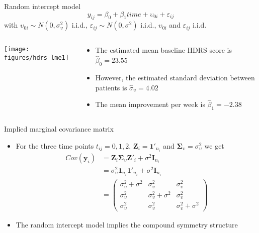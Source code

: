\documentclass{beamer}
\newcommand{\vect}[1]{\mathbf{#1}}
\newcommand{\mat}[1]{\mathbf{#1}}
\newcommand{\gmat}[1]{\boldsymbol{#1}}
\begin{document}
\begin{frame}[fragile]{Random intercept model}
  \[
    y_{ij} = \beta_0 + \beta_1 time + \upsilon_{0i} + \varepsilon_{ij}
  \]
with $\upsilon_{0i} \sim N(0, \sigma^2_{\upsilon})$ i.i.d.,
$\varepsilon_{ij} \sim N(0, \sigma^2)$ i.i.d., $\upsilon_{0i}$ and
$\varepsilon_{ij}$ i.i.d.\\[2ex]
\begin{columns}
\begin{column}{6cm}
\texttt{[image: figures/hdrs-lme1]}
\end{column}
%
\begin{column}{5cm}
  \begin{itemize}
    \item The estimated mean baseline HDRS score is $\hat{\beta}_0 =
      23.55$
    \item However, the estimated standard deviation between patients is
      $\hat{\sigma}_\upsilon = 4.02$
    \item The mean improvement per week is $\hat{\beta}_1 = -2.38$
  \end{itemize}
\end{column}
\end{columns}
\end{frame}

\begin{frame}{Implied marginal covariance matrix}
  \begin{itemize}
    \item For the three time points $t_{ij} = 0, 1, 2$, $\mat{Z}_i =
      \vect{1}'_{n_i}$ and $\gmat{\Sigma}_\upsilon = \sigma^2_\upsilon$ we
      get
\begin{align*}
  Cov(\vect{y}_i) &=
    \mat{Z}_i \gmat{\Sigma}_\upsilon \mat{Z}'_i + \sigma^2 \mat{I}_{n_i} \\
  &= \sigma^2_\upsilon \vect{1}_{n_i} \vect{1}'_{n_i} +
     \sigma^2 \mat{I}_{n_i} \\
  &= 
  \begin{pmatrix}
    \sigma^2_\upsilon + \sigma^2 & \sigma^2_\upsilon & \sigma^2_\upsilon \\
    \sigma^2_\upsilon & \sigma^2_\upsilon + \sigma^2 & \sigma^2_\upsilon \\
    \sigma^2_\upsilon & \sigma^2_\upsilon & \sigma^2_\upsilon + \sigma^2
  \end{pmatrix}
\end{align*}
\item The random intercept model implies the compound symmetry structure
  \end{itemize}
\end{frame}
\end{document}
